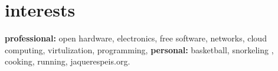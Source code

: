 \documentclass[]{friggeri-cv}
\begin{document}
\section{interests}

\textbf{professional:} open hardware, electronics, free software, networks, cloud computing, virtulization, programming, \textbf{personal:} basketball, snorkeling , cooking, running, jaquerespeis.org.

%

% 
\end{document}
